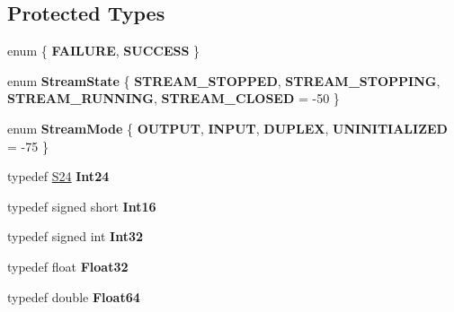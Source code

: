 \subsection*{Protected Types}
\begin{DoxyCompactItemize}
\item 
enum \{ {\bfseries F\+A\+I\+L\+U\+RE}, 
{\bfseries S\+U\+C\+C\+E\+SS}
 \}\hypertarget{class_rt_api_a29127ff22e82fa088256b3f6583cb495}{}\label{class_rt_api_a29127ff22e82fa088256b3f6583cb495}

\item 
enum {\bfseries Stream\+State} \{ {\bfseries S\+T\+R\+E\+A\+M\+\_\+\+S\+T\+O\+P\+P\+ED}, 
{\bfseries S\+T\+R\+E\+A\+M\+\_\+\+S\+T\+O\+P\+P\+I\+NG}, 
{\bfseries S\+T\+R\+E\+A\+M\+\_\+\+R\+U\+N\+N\+I\+NG}, 
{\bfseries S\+T\+R\+E\+A\+M\+\_\+\+C\+L\+O\+S\+ED} = -\/50
 \}\hypertarget{class_rt_api_a9941bf8dc3ead0a3de58fd8823390da7}{}\label{class_rt_api_a9941bf8dc3ead0a3de58fd8823390da7}

\item 
enum {\bfseries Stream\+Mode} \{ {\bfseries O\+U\+T\+P\+UT}, 
{\bfseries I\+N\+P\+UT}, 
{\bfseries D\+U\+P\+L\+EX}, 
{\bfseries U\+N\+I\+N\+I\+T\+I\+A\+L\+I\+Z\+ED} = -\/75
 \}\hypertarget{class_rt_api_a7df4fd666bdd1ec02cffd4921cbcbebd}{}\label{class_rt_api_a7df4fd666bdd1ec02cffd4921cbcbebd}

\item 
typedef \hyperlink{class_s24}{S24} {\bfseries Int24}\hypertarget{class_rt_api_a9dc07a6666436dc0809c38435885db81}{}\label{class_rt_api_a9dc07a6666436dc0809c38435885db81}

\item 
typedef signed short {\bfseries Int16}\hypertarget{class_rt_api_aa5a524a28ea28f031ca0a0a9e024ff39}{}\label{class_rt_api_aa5a524a28ea28f031ca0a0a9e024ff39}

\item 
typedef signed int {\bfseries Int32}\hypertarget{class_rt_api_a438fed76129128575398354b306a4cc2}{}\label{class_rt_api_a438fed76129128575398354b306a4cc2}

\item 
typedef float {\bfseries Float32}\hypertarget{class_rt_api_aefb8b52708f6a43a62fcb31da11c0484}{}\label{class_rt_api_aefb8b52708f6a43a62fcb31da11c0484}

\item 
typedef double {\bfseries Float64}\hypertarget{class_rt_api_ae10c5228f8184b69c1102f5d90992f23}{}\label{class_rt_api_ae10c5228f8184b69c1102f5d90992f23}

\end{DoxyCompactItemize}
